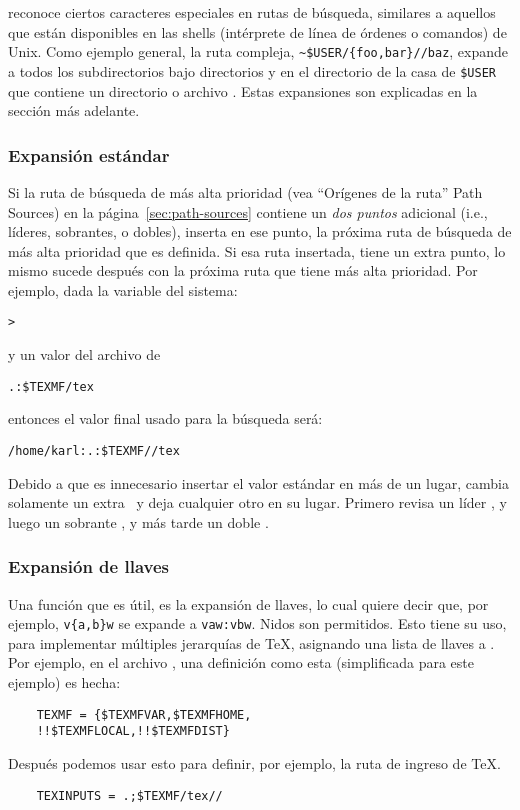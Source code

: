 \documentclass{article}
\begin{document}
	\KPS{} reconoce ciertos caracteres especiales en rutas
	de búsqueda, similares a aquellos que están disponibles
	en las shells (intérprete de línea de órdenes o comandos) de Unix.
	Como ejemplo general, la ruta compleja,
	\verb+~$USER/{foo,bar}//baz+, expande a todos los
	subdirectorios bajo directorios  y 
	en el directorio de la casa de \texttt{\$USER} que
	contiene un directorio o archivo . Estas
	expansiones son explicadas en la sección más adelante.
	
	\subsubsection{Expansión estándar}
	\label{sec:default-expansion}

        Si la ruta de búsqueda de más alta prioridad (vea ``Orígenes
        de la ruta'' Path Sources) en la página~\ref{sec:path-sources}
        contiene un \emph{dos puntos} adicional (i.e., líderes,
        sobrantes, o dobles), \KPS{} inserta en ese punto, la próxima
        ruta de búsqueda de más alta prioridad que es definida. Si esa
        ruta insertada, tiene un extra punto, lo mismo sucede después con la
        próxima ruta que tiene más alta prioridad.  Por ejemplo, dada la
        variable del sistema:

\begin{alltt}
	> 
\end{alltt}
y un valor  del archivo  de

\begin{alltt}
	.:\$TEXMF/tex
\end{alltt}
entonces el valor final usado para la búsqueda será:

\begin{alltt}
	/home/karl:.:\$TEXMF//tex
\end{alltt}

Debido a que es innecesario insertar el valor estándar en más
de un lugar, \KPS{} cambia solamente un extra \samp{:}\ y deja
cualquier otro en su lugar. Primero revisa un líder \samp{:},
y luego un sobrante \samp{:}, y más tarde un doble \samp{:}.

\subsubsection{Expansión de llaves}
\label{sec:brace-expansion}

Una función que es útil, es la expansión de 
llaves, lo cual quiere decir que, por ejemplo,
\verb+v{a,b}w+ se expande a \verb+vaw:vbw+. Nidos son
permitidos. Esto tiene su uso, para implementar múltiples
jerarquías de \TeX{}, asignando una lista de llaves a
.
Por ejemplo, en el archivo , una definición
como esta (simplificada para este ejemplo) es hecha:
\begin{verbatim}
	TEXMF = {$TEXMFVAR,$TEXMFHOME,
	!!$TEXMFLOCAL,!!$TEXMFDIST}
\end{verbatim}
Después podemos usar esto para definir, por ejemplo, la ruta de
ingreso de \TeX{}. 
\begin{verbatim}
	TEXINPUTS = .;$TEXMF/tex//
\end{verbatim}
\end{document}
